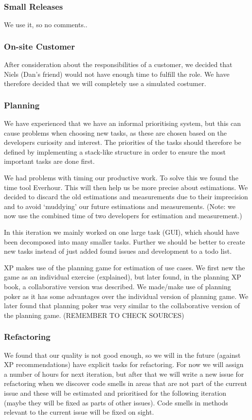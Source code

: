 \subsubsection{Small Releases}
We use it, so no comments..

\subsubsection{On-site Customer}
After consideration about the responsibilities of a customer, we decided that Niels (Dan’s friend) would not have enough time to fulfill the role.
We have therefore decided that we will completely use a simulated costumer.

\subsubsection{Planning}
We have experienced that we have an informal prioritising system, but this can cause problems when choosing new tasks, as these are chosen based on the developers curiosity and interest. The priorities of the tasks should therefore be defined by implementing a stack-like structure in order to ensure the most important tasks are done first.

We had problems with timing our productive work. To solve this we found the time tool Everhour.
This will then help us be more precise about estimations.
We decided to discard the old estimations and measurements due to their imprecision and to avoid `muddying' our future estimations and measurements. (Note: we now use the combined time of two developers for estimation and measurement.)

In this iteration we mainly worked on one large task (GUI), which should have been decomposed into many smaller tasks. Further we should be better to create new tasks instead of just added found issues and development to a todo list.

XP makes use of the planning game for estimation of use cases. We first new the game as an individual exercise (explained), but later found, in the planning XP book, a collaborative version was described. We made/make use of planning poker as it has some advantages over the individual version of planning game. We later found that planning poker was very similar to the collaborative version of the planning game. (REMEMBER TO CHECK SOURCES) 

\subsubsection{Refactoring}
We found that our quality is not good enough, so we will in the future (against XP recommendations) have explicit tasks for refactoring. 
For now we will assign a number of hours for next iteration, but after that we will write a new issue for refactoring when we discover code smells in areas that are not part of the current issue and these will be estimated and prioritised for the following iteration (maybe they will be fixed as parts of other issues). Code smells in methods relevant to the current issue will be fixed on sight.

